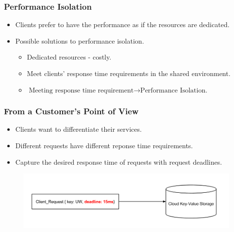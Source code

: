 \documentclass{beamer}
\newcommand{\myv}{\vspace{3 mm}}
\begin{document}
\begin{frame}
  \frametitle{Performance Isolation}
  \begin{itemize}
  \item Clients prefer to have the performance as if the resources are dedicated.
    \myv
  \item Possible solutions to performance isolation.
    \myv
    \begin{itemize}
    \item Dedicated resources - costly.
      \myv
    \item Meet clients' response time requirements in the shared environment.
      \myv
    \item \(\text{Meeting response time requirement} \rightarrow \text{Performance Isolation.}\)
    \end{itemize}
  \end{itemize}
\end{frame}


\begin{frame}
  \frametitle{From a Customer's Point of View}
  \myv
  \begin{itemize}
  \item Clients want to differentiate their services.
    \myv
  \item Different requests have different reponse time requirements.
    \myv
  \item Capture the desired response time of requests with request deadlines.
  \end{itemize}
  \vspace{-5 mm}
  \begin{figure}
    \includegraphics[scale=0.35]{img/Request_Deadline_Example.png}
  \end{figure}
\end{frame}
\end{document}
